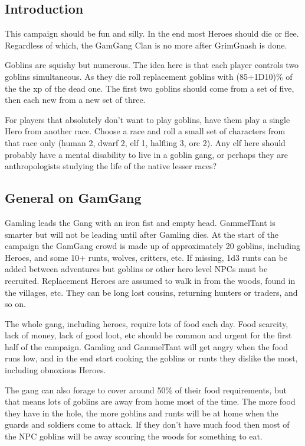 \subsection*{Introduction}

This campaign should be fun and silly. In the end most Heroes should die or flee. Regardless of which, the GamGang Clan is no more after GrimGnash is done.

Goblins are squishy but numerous. The idea here is that each player controls two goblins simultaneous. As they die roll replacement goblins with (85+1D10)\% of the the xp of the dead one. The first two goblins should come from a set of five, then each new from a new set of three.

For players that absolutely don't want to play goblins, have them play a single Hero from another race. Choose a race and roll a small set of characters from that race only (human 2, dwarf 2, elf 1, halfling 3, orc 2). Any elf here should probably have a mental disability to live in a goblin gang, or perhaps they are anthropologists studying the life of the native lesser races?


\subsection*{General on GamGang}

Gamling leads the Gang with an iron fist and empty head. GammelTant is smarter but will not be leading until after Gamling dies.
At the start of the campaign the GamGang crowd is made up of approximately 20 goblins, including Heroes, and some 10+ runts, wolves, critters, etc. If missing, 1d3 runts can be added between adventures but goblins or other hero level NPCs must be recruited. Replacement Heroes are assumed to walk in from the woods, found in the villages, etc. They can be long lost cousins, returning hunters or traders, and so on.

The whole gang, including heroes, require lots of food each day. Food scarcity, lack of money, lack of good loot, etc should be common and urgent for the first half of the campaign. Gamling and GammelTant will get angry when the food runs low, and in the end start cooking the goblins or runts they dislike the most, including obnoxious Heroes.

The gang can also forage to cover around 50\% of their food requirements, but that means lots of goblins are away from home most of the time. The more food they have in the hole, the more goblins and runts will be at home when the guards and soldiers come to attack. If they don't have much food then most of the NPC goblins will be away scouring the woods for something to eat.


